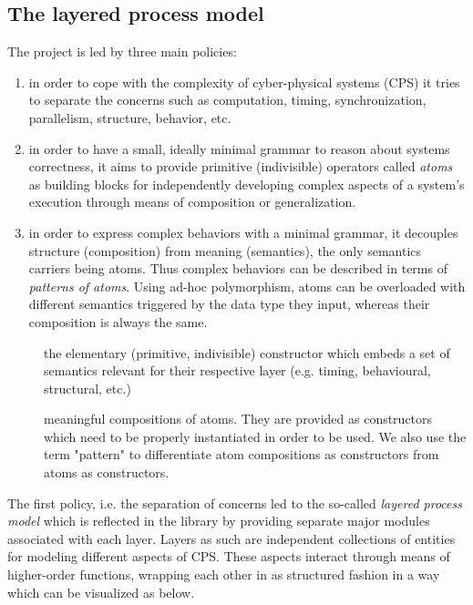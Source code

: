 \subsection{The layered process model}
The  project is led by three main policies:\par
\begin{enumerate}
\item 
in order to cope with the complexity of cyber-physical systems
 (CPS) it tries to separate the concerns such as computation,
 timing, synchronization, parallelism, structure, behavior, etc.\par

\item 
in order to have a small, ideally minimal grammar to reason
 about systems correctness, it aims to provide primitive
 (indivisible) operators called \emph{atoms} as building blocks for
 independently developing complex aspects of a system's execution
 through means of composition or generalization.\par

\item 
in order to express complex behaviors with a minimal grammar,
 it decouples structure (composition) from meaning (semantics),
 the only semantics carriers being atoms. Thus complex behaviors
 can be described in terms of \emph{patterns of atoms}. Using ad-hoc
 polymorphism, atoms can be overloaded with different semantics
 triggered by the data type they input, whereas their composition
 is always the same.\par

\end{enumerate}
\begin{description}
\item[] the elementary (primitive, indivisible) constructor
 which embeds a set of semantics relevant for their respective
 layer (e.g. timing, behavioural, structural, etc.)
\item[] meaningful compositions of atoms. They are
 provided as constructors which need to be properly instantiated
 in order to be used. We also use the term "pattern" to
 differentiate atom compositions as constructors from atoms as
 constructors.
\end{description}The first policy, i.e. the separation of concerns led to the
 so-called \emph{layered process model} which is reflected in the
 library by providing separate major modules associated with each
 layer. Layers as such are independent collections of entities for
 modeling different aspects of CPS. These aspects interact through
 means of higher-order functions, wrapping each other in as
 structured fashion in a way which can be visualized as below.\par
                 
